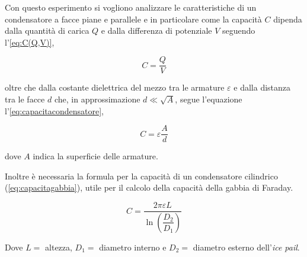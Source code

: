 {\fontsize{12}{14}\selectfont
Con questo esperimento si vogliono analizzare le caratteristiche di un condensatore a facce piane e parallele e in particolare come la capacità $C$ dipenda dalla quantità di carica $Q$ e dalla differenza di potenziale $V$ seguendo l'\autoref{eq:C(Q,V)},

\begin{equation} \label{eq:C(Q,V)}
    C = \frac{Q}{V}
\end{equation}

oltre che dalla costante dielettrica del mezzo tra le armature $\varepsilon$ e dalla distanza tra le facce $d$ che, in approssimazione $d \ll \sqrt{A}$, segue l'equazione l'\autoref{eq:capacitacondensatore},

\begin{equation} \label{eq:capacitacondensatore}
    C = \varepsilon \frac{A}{d}
\end{equation}

dove $A$ indica la superficie delle armature.

Inoltre è necessaria la formula per la capacità di un condensatore cilindrico (\autoref{eq:capacitagabbia}), utile per il calcolo della capacità della gabbia di Faraday.

\begin{equation} \label{eq:capacitagabbia}
    C = \dfrac{2 \pi \varepsilon L}{\ln{\left(\dfrac{D_2}{D_1}\right)}}
\end{equation}

Dove $L =$ altezza, $D_1 =$ diametro interno e $D_2 =$ diametro esterno dell'\emph{ice pail}.
\par}
